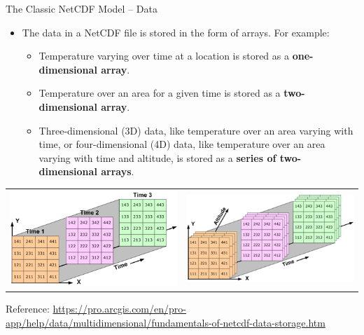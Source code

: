 \documentclass[compress,11pt,xcolor=svgnames,aspectratio=169]{beamer}
\begin{document}
\begin{frame}[fragile]{The Classic NetCDF Model -- Data}

\begin{itemize}

  \item The data in a NetCDF file is stored in the form of arrays. For example:\\[0.2cm]

  \begin{itemize}
  \setlength\itemsep{0.2cm}

    \item Temperature varying over time at a location is stored as a \textbf{one-dimensional array}.
    \item Temperature over an area for a given time is stored as a \textbf{two-dimensional array}.
    \item Three-dimensional (3D) data, like temperature over an area varying with time, or four-dimensional (4D) data, like temperature over an area varying with time and altitude, is stored as a \textbf{series of two-dimensional arrays}.

  \end{itemize}

\end{itemize}

\begin{center}
\begin{tabular}{cc}
\includegraphics[scale=0.5]{fig/netcdf1} &
\includegraphics[scale=0.5]{fig/netcdf2}
\end{tabular}
\end{center}

{\tiny Reference: \url{https://pro.arcgis.com/en/pro-app/help/data/multidimensional/fundamentals-of-netcdf-data-storage.htm}}

\nocite{netcdf}

\end{frame}
\end{document}
